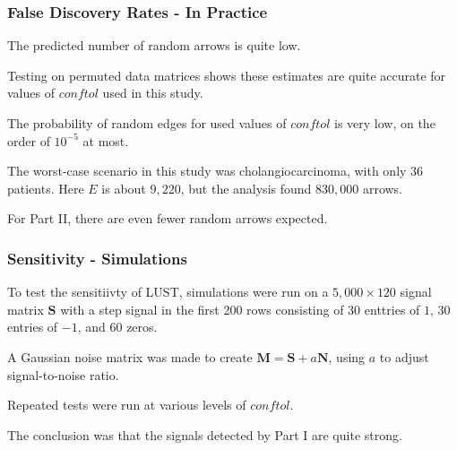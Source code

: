 \documentclass[
	11pt, %
]{beamer}
\begin{document}

\begin{frame}
    \frametitle{False Discovery Rates - In Practice}
    The predicted number of random arrows is quite low.
    \pause
    \bigskip

    Testing on permuted data matrices shows these estimates are quite accurate for values of $conftol$ used in this study.
    \pause
    \bigskip

    The probability of random edges for used values of $conftol$ is very low, on the order of $10^{-5}$ at most.
    \pause
    \bigskip

    The worst-case scenario in this study was cholangiocarcinoma, with only 36 patients. Here $E$ is about $9,220$, but the analysis found $830,000$ arrows.
    \pause
    \bigskip

    For Part II, there are even fewer random arrows expected.
\end{frame}

\begin{frame}
    \frametitle{Sensitivity - Simulations}
    To test the sensitiivty of LUST, simulations were run on a $5,000 \times 120$ signal matrix $\mathbf{S}$ with a step signal in the first 200 rows consisting of 30 enttries of $1$, 30 entries of $-1$, and 60 zeros.
    \pause
    \bigskip
    
    A Gaussian noise matrix was made to create $\mathbf{M} = \mathbf{S} + a\mathbf{N}$, using $a$ to adjust signal-to-noise ratio.
    \pause
    \bigskip
    
    Repeated tests were run at various levels of $conftol$. 
    \pause
    \bigskip
    
    The conclusion was that the signals detected by Part I are quite strong.
\end{frame}
\end{document}
